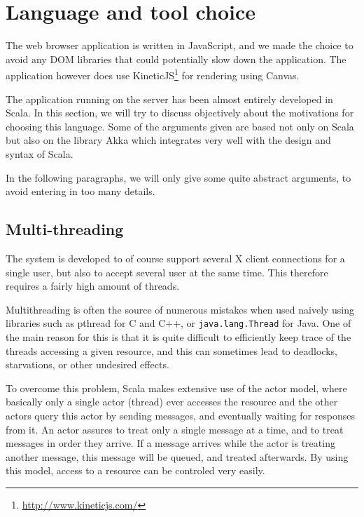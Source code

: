 \section{Language and tool choice}
%
The web browser application is written in JavaScript, and we made the 
choice to avoid any DOM libraries that could potentially slow down the application.
The application however does use KineticJS\footnote{\url{http://www.kineticjs.com/}}
for rendering using Canvas.
%

The application running on the server has been almost entirely developed in Scala. %
In this section, we will try to discuss objectively about 
the motivations for choosing this language. Some of the arguments given 
are based not only on Scala but also on the library Akka which integrates 
very well with the design and syntax of Scala.

In the following paragraphs, we will only give some quite abstract arguments, 
to avoid entering in too many details. %
%
\subsection{Multi-threading}
The system is developed to of course support several X client connections 
for a single user, but also to accept several user at the same time.
This therefore requires a fairly high amount of threads.

Multithreading is often the source of numerous mistakes when used naively 
using libraries such as pthread for C and C++, or \lstinline{java.lang.Thread} 
for Java. One of the main reason for this is that it is quite difficult to 
efficiently keep trace of the threads accessing a given resource, 
and this can sometimes lead to deadlocks, starvations, or other undesired 
effects.

To overcome this problem, Scala makes extensive use of the actor model, where 
basically only a single actor (thread) ever accesses the resource and 
the other actors query this actor by sending messages, and eventually waiting 
for responses from it. An actor assures to treat only a single message 
at a time, and to treat messages in order they arrive. If a message 
arrives while the actor is treating another message, this message will 
be queued, and treated afterwards. By using this model, access to a 
resource can be controled very easily.

